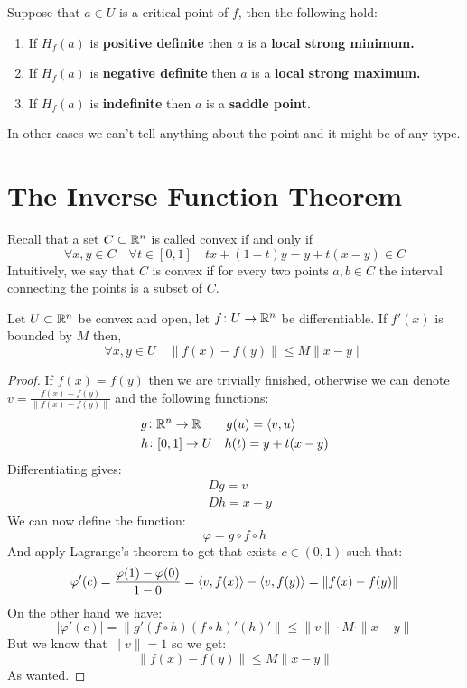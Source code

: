 \documentclass[11pt,a4paper]{article}
\begin{document}
\newpage

Suppose that $a \in U$ is a critical point of $f$, then the following
hold:
\begin{enumerate}
  \item If $H_f(a)$ is \textbf{positive definite} then $a$ is a 
  \textbf{local strong minimum.}
  \item If $H_f(a)$ is \textbf{negative definite} then $a$ is a 
  \textbf{local strong maximum.}
  \item If $H_f(a)$ is \textbf{indefinite} then $a$ is a 
  \textbf{saddle point.}
\end{enumerate}
In other cases we can't tell anything about the point and it might be
of any type.

\newpage

\section{The Inverse Function Theorem}
Recall that a set $C \subset \mathbb{R}^n$ is called convex if and only if
\[
  \forall x,y \in C \quad \forall t \in [0,1] \quad
  tx + (1-t)y = y + t(x-y) \in C
\]
Intuitively, we say that $C$ is convex if for every two points $a,b \in C$
the interval connecting the points is a subset of $C$.
\begin{proposition}
  Let $U \subset \mathbb{R}^n$ be convex and open, let $f \colon U \to \mathbb{R}^n$
  be differentiable. If $f'(x)$ is bounded by $M$ then,
  \[
     \forall x,y \in U \quad \|f(x) - f(y)\| \le M\|x - y\|
  \]
\end{proposition}
\begin{proof}
  If $f(x) = f(y)$ then we are trivially finished, otherwise we can
  denote $v = \frac{f(x) - f(y)}{\|f(x) - f(y)\|}$ and the following
  functions:
  \begin{align*}
    &g \colon \mathbb{R}^n \to \mathbb{R} \quad \quad g(u) = \langle v, u \rangle \\
    &h \colon [0,1] \to U \quad h(t) = y + t(x-y)
  \end{align*}
  Differentiating gives:
  \begin{align*}
    &Dg = v \\
    &Dh = x-y
  \end{align*}
We can now define the function:
\[
  \varphi = g \circ f \circ h
\]
And apply Lagrange's theorem to get that exists $c \in (0,1)$ such that:
\[
  \varphi'(c) = \frac{\varphi(1) - \varphi(0)}{1 - 0} = 
  \langle v, f(x) \rangle - \langle v, f(y) \rangle = \|f(x) - f(y)\|
\]
On the other hand we have:
\[
  |\varphi'(c)| = \|g'(f \circ h)(f \circ h)'(h)'\| \le 
  \|v\| \cdot M \cdot \|x - y\|
\]
But we know that $\|v\| = 1$ so we get:
\[
  \|f(x) - f(y)\| \le M\|x - y\|
\]
As wanted.
\end{proof}
\end{document}
